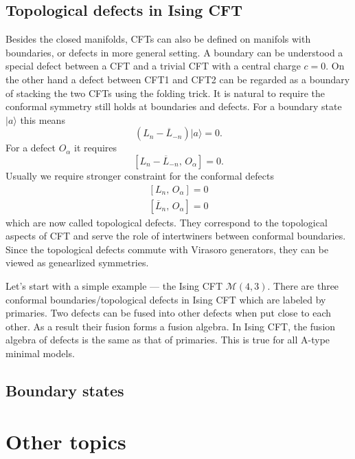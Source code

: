 \documentclass[submission, PhysLectNotes]{SciPost}
\begin{document}
\subsection{Topological defects in Ising CFT}
Besides the closed manifolds, CFTs can also be defined on manifols with boundaries, or defects in more general setting. A boundary can be understood a special defect between a CFT and a trivial CFT with a central charge $c=0$. On the other hand a defect between CFT1 and CFT2 can be regarded as a boundary of stacking the two CFTs using the folding trick. It is natural to require the conformal symmetry still holds at boundaries and defects. For a boundary state $\vert a \rangle$ this means 
\begin{equation}
	\left ( L_n - \overline{L}_{-n} \right ) \vert a \rangle = 0.
\end{equation}
For a defect $O_\alpha$ it requires
\begin{equation}
	\left[ L_n - \overline{L}_{-n},\, O_\alpha \right] = 0.
\end{equation}
Usually we require stronger constraint for the conformal defects 
\begin{equation}
	\begin{aligned}
		\left[ L_n,\, O_\alpha \right] = 0 \\
		\left[ \overline{L}_{n},\, O_\alpha \right] = 0
	\end{aligned}
\end{equation}
which are now called topological defects. They correspond to the topological aspects of CFT and serve the role of intertwiners between conformal boundaries. Since the topological defects commute with Virasoro generators, they can be viewed as genearlized symmetries. 

Let's start with a simple example --- the Ising CFT $\mathcal{M}(4,3)$. There are three conformal boundaries/topological defects in Ising CFT which are labeled by primaries. Two defects can be fused into other defects when put close to each other. As a result their fusion forms a fusion algebra. In Ising CFT, the fusion algebra of defects is the same as that of primaries. This is true for all A-type minimal models. 

\subsection{Boundary states}

\section{Other topics}
\end{document}
